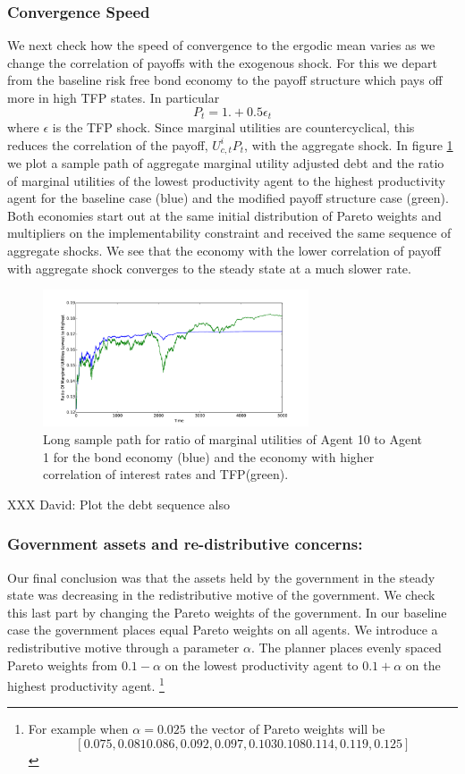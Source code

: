 \documentclass[11.5pt,twoside]{article}
\begin{document}
\subsubsection{Convergence Speed}
We next check how the speed of convergence to the ergodic mean varies as we change the correlation of payoffs with the exogenous shock.  For this we depart from the baseline risk free bond economy to the payoff structure which pays off more in high TFP states. In particular
\[
	P_t = 1. + 0.5\epsilon_t
\]where $\epsilon$ is the TFP shock.   Since marginal utilities are countercyclical, this reduces the correlation of the payoff, $U^i_{c,t}P_t$, with the aggregate shock.  In figure \ref{fig: convergence speed} we plot a sample path of aggregate marginal utility adjusted debt and the ratio of marginal utilities of the lowest productivity agent to the highest productivity agent for the baseline case (blue) and the modified payoff structure case (green).  Both economies start out at the same initial distribution of Pareto weights and multipliers on the implementability constraint and received the same sequence of aggregate shocks.  We see that the economy with the lower correlation of payoff with aggregate shock converges to the steady state at a much slower rate.
 \begin{figure}[htp]
 \label{fig: convergence speed}
 	\centering
 	\includegraphics[width=0.7\textwidth]{plots/convergence.pdf}
 	\caption{Long sample path for ratio of marginal utilities of  Agent 10 to Agent 1 for the bond economy (blue) and the economy with higher correlation of interest rates and TFP(green).}
 \end{figure}

 
 
 XXX David: Plot the debt sequence also


 

\subsubsection{Government assets and re-distributive concerns:}  Our final conclusion was that the assets held by the government in the steady state was decreasing in the redistributive motive of the government. We check this last part by changing the Pareto weights of the government.  In our baseline case the government places equal Pareto weights on all agents.  We introduce a redistributive motive through a parameter $\alpha$.  The planner places evenly spaced Pareto weights from $0.1-\alpha$ on the lowest productivity agent to $0.1+\alpha$ on the highest productivity agent. \footnote{For example when $\alpha = 0.025$ the vector of Pareto weights will be
\[
[ 0.075     ,  0.081  0.086,  0.092,  0.097,
        0.103  0.108  0.114,  0.119 , 0.125     ]
\]}
\end{document}
